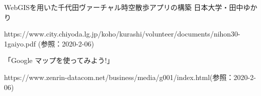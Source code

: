 \documentclass[a4paper, twoside]{jarticle}
\begin{document}
\begin{thebibliography}{99}
 WebGISを用いた千代田ヴァーチャル時空散歩アプリの構築 日本大学・田中ゆかり\par
https://www.city.chiyoda.lg.jp/koho/kurashi/volunteer/documents/nihon30-1gaiyo.pdf (参照：2020-2-06)

 「Google マップを使ってみよう!」\par
https://www.zenrin-datacom.net/business/media/g001/index.html(参照：2020-2-06)



\end{thebibliography}
\end{document}

